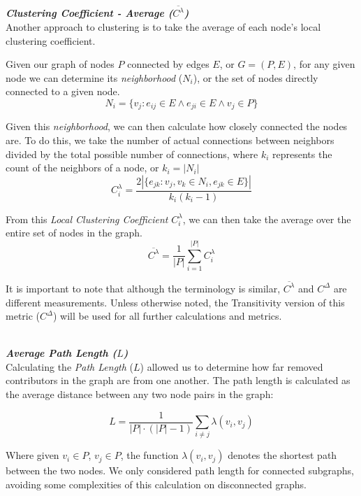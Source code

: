 \documentclass{proc}
\begin{document}
\noindent\\\textit{\textbf{Clustering Coefficient - Average ($\overline{C^{\lambda}}$)}}\\
Another approach to clustering is to take the average of each node's local clustering coefficient\cite{watts1998collective}.

Given our graph of nodes $P$ connected by edges $E$, or ${G=(P,E)}$, for any given node we can determine its \textit{neighborhood} ($N_i$), or the set of nodes directly connected to a given node.
\[ N_i = \{v_j : e_{ij} \in E \wedge e_{ji} \in E \wedge v_j \in P\} \]

Given this \textit{neighborhood}, we can then calculate how closely connected the nodes are. To do this, we take the number of actual connections between neighbors divided by the total possible number of connections, where $k_i$ represents the count of the neighbors of a node, or {$k_i = |N_i|$}
\[ C^{\lambda}_i = \frac{2|\{e_{jk}: v_j,v_k \in N_i, e_{jk} \in E\}|}{k_i(k_i-1)} \]

From this \textit{Local Clustering Coefficient} $C^{\lambda}_i$, we can then take the average over the entire set of nodes in the graph.
\[ \overline{C^\lambda} = \frac{1}{|P|}\sum^{|P|}_{i=1}C^{\lambda}_i \]

It is important to note that although the terminology is similar\cite{uzzi2005collaboration}, $\overline{C^\lambda}$ and $C^\Delta$ are different measurements. Unless otherwise noted, the Transitivity version of this metric ($C^\Delta$) will be used for all further calculations and metrics.

\noindent\\\textit{\textbf{Average Path Length ($L$)}}\\
Calculating the \textit{Path Length} ($L$) allowed us to determine how far removed contributors in the graph are from one another. The path length is calculated as the average distance between any two node pairs in the graph:

\[L = \frac{1}{|P| \cdot (|P|-1)} \sum_{i \neq j}\lambda(v_i,v_j)\]

Where given {$v_i \in P$}, {$v_j \in P$}, the function {$\lambda(v_i,v_j)$} denotes the shortest path between the two nodes. We only considered path length for connected subgraphs, avoiding some complexities of this calculation on disconnected graphs\cite{boccaletti2006complex}.
\end{document}
